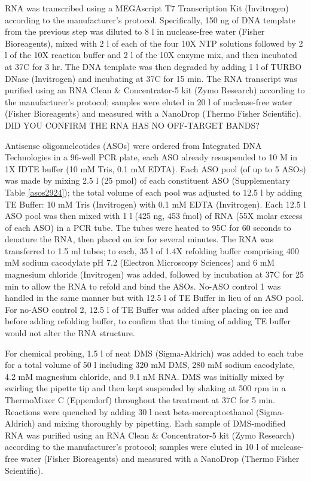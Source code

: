 \documentclass[main.tex]{subfiles}
\begin{document}
RNA was transcribed using a MEGAscript T7 Transcription Kit (Invitrogen) according to the manufacturer's protocol.
Specifically, 150 ng of DNA template from the previous step was diluted to 8 \textmu l in nuclease-free water (Fisher Bioreagents), mixed with 2 \textmu l of each of the four 10X NTP solutions followed by 2 \textmu l of the 10X reaction buffer and 2 \textmu l of the 10X enzyme mix, and then incubated at 37\textdegree C for 3 hr.
The DNA template was then degraded by adding 1 \textmu l of TURBO DNase (Invitrogen) and incubating at 37\textdegree C for 15 min.
The RNA transcript was purified using an RNA Clean \& Concentrator-5 kit (Zymo Research) according to the manufacturer's protocol; samples were eluted in 20 \textmu l of nuclease-free water (Fisher Bioreagents) and measured with a NanoDrop (Thermo Fisher Scientific).
DID YOU CONFIRM THE RNA HAS NO OFF-TARGET BANDS?

Antisense oligonucleotides (ASOs) were ordered from Integrated DNA Technologies in a 96-well PCR plate, each ASO already resuspended to 10 \textmu M in 1X IDTE buffer (10 mM Tris, 0.1 mM EDTA).
Each ASO pool (of up to 5 ASOs) was made by mixing 2.5 \textmu l (25 pmol) of each constituent ASO (Supplementary Table \ref{asos2924}); the total volume of each pool was adjusted to 12.5 \textmu l by adding TE Buffer: 10 mM Tris (Invitrogen) with 0.1 mM EDTA (Invitrogen).
Each 12.5 \textmu l ASO pool was then mixed with 1 \textmu l (425 ng, 453 fmol) of RNA (55X molar excess of each ASO) in a PCR tube.
The tubes were heated to 95\textdegree C for 60 seconds to denature the RNA, then placed on ice for several minutes.
The RNA was transferred to 1.5 ml tubes; to each, 35 \textmu l of 1.4X refolding buffer comprising 400 mM sodium cacodylate pH 7.2 (Electron Microscopy Sciences) and 6 mM magnesium chloride (Invitrogen) was added, followed by incubation at 37\textdegree C for 25 min to allow the RNA to refold and bind the ASOs.
No-ASO control 1 was handled in the same manner but with 12.5 \textmu l of TE Buffer in lieu of an ASO pool.
For no-ASO control 2, 12.5 \textmu l of TE Buffer was added after placing on ice and before adding refolding buffer, to confirm that the timing of adding TE buffer would not alter the RNA structure.

For chemical probing, 1.5 \textmu l of neat DMS (Sigma-Aldrich) was added to each tube for a total volume of 50 \textmu l including 320 mM DMS, 280 mM sodium cacodylate, 4.2 mM magnesium chloride, and 9.1 nM RNA.
DMS was initially mixed by swirling the pipette tip and then kept suspended by shaking at 500 rpm in a ThermoMixer C (Eppendorf) throughout the treatment at 37\textdegree C for 5 min.
Reactions were quenched by adding 30 \textmu l neat beta-mercaptoethanol (Sigma-Aldrich) and mixing thoroughly by pipetting.
Each sample of DMS-modified RNA was purified using an RNA Clean \& Concentrator-5 kit (Zymo Research) according to the manufacturer's protocol; samples were eluted in 10 \textmu l of nuclease-free water (Fisher Bioreagents) and measured with a NanoDrop (Thermo Fisher Scientific).
\end{document}
